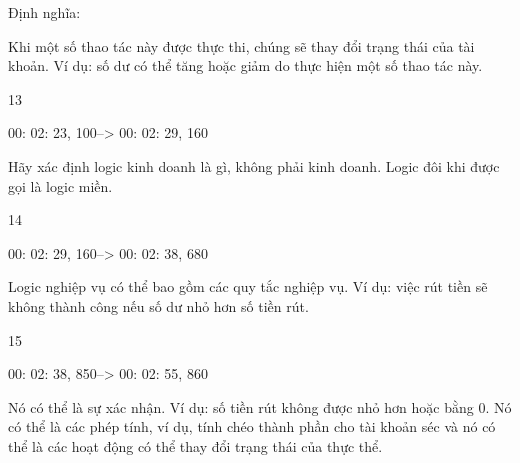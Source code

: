 

Định nghĩa:


\begin{example}

\end{example}






Khi một số thao tác này được thực thi, chúng sẽ thay đổi trạng thái của tài khoản. Ví dụ: số dư có thể tăng hoặc giảm do thực hiện một số thao tác này.

13

00: 02: 23, 100--> 00: 02: 29, 160

Hãy xác định logic kinh doanh là gì, không phải kinh doanh. Logic đôi khi được gọi là logic miền.

14

00: 02: 29, 160--> 00: 02: 38, 680

Logic nghiệp vụ có thể bao gồm các quy tắc nghiệp vụ. Ví dụ: việc rút tiền sẽ không thành công nếu số dư nhỏ hơn số tiền rút.

15

00: 02: 38, 850--> 00: 02: 55, 860

Nó có thể là sự xác nhận. Ví dụ: số tiền rút không được nhỏ hơn hoặc bằng 0. Nó có thể là các phép tính, ví dụ, tính chéo thành phần cho tài khoản séc và nó có thể là các hoạt động có thể thay đổi trạng thái của thực thể.

